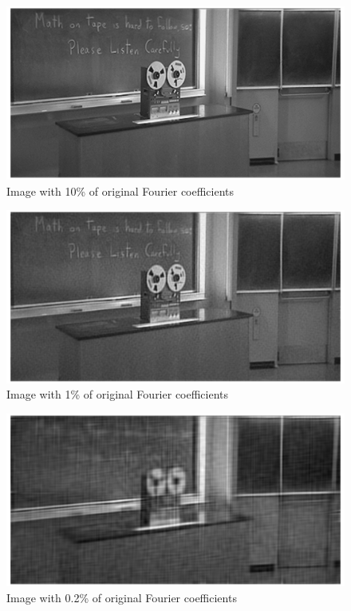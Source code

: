 \documentclass[11pt]{article}
\begin{document}
\subsection{} %
\begin{figure}[H]
    \centering
    \includegraphics[width=6.5in]{3cfig1.png}
    \caption{Image with 10\% of original Fourier coefficients}
    \label{3cfig1}
\end{figure}
\begin{figure}[H]
    \centering
    \includegraphics[width=6.5in]{3cfig2.png}
    \caption{Image with 1\% of original Fourier coefficients}
    \label{3cfig2}
\end{figure}
\begin{figure}[H]
    \centering
    \includegraphics[width=6.5in]{3cfig3.png}
    \caption{Image with 0.2\% of original Fourier coefficients}
    \label{3cfig3}
\end{figure}
\end{document}
